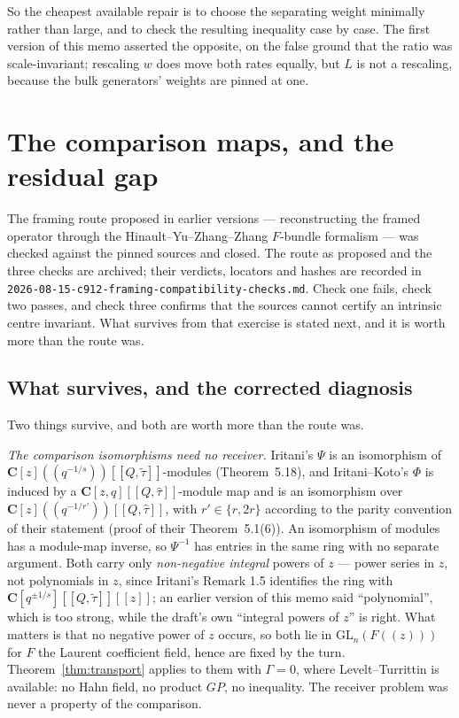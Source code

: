 \documentclass[11pt]{article}
\theoremstyle{definition}
\theoremstyle{remark}
\newcommand{\C}{\mathbf C}
\begin{document}
So the cheapest available repair is to choose the separating weight minimally
rather than large, and to check the resulting inequality case by case. The first
version of this memo asserted the opposite, on the false ground that the ratio
was scale-invariant; rescaling $w$ does move both rates equally, but $L$ is not
a rescaling, because the bulk generators' weights are pinned at one.

\section{The comparison maps, and the residual gap}
\label{sec:hyzz}

The framing route proposed in earlier versions --- reconstructing the
framed operator through the Hinault--Yu--Zhang--Zhang $F$-bundle
formalism --- was checked against the pinned sources and closed.  The
route as proposed and the three checks are archived; their verdicts,
locators and hashes are recorded in
\texttt{2026-08-15-c912-framing-compatibility-checks.md}.  Check one
fails, check two passes, and check three confirms that the sources
cannot certify an intrinsic centre invariant.  What survives from that
exercise is stated next, and it is worth more than the route was.

\subsection*{What survives, and the corrected diagnosis}

Two things survive, and both are worth more than the route was.

\emph{The comparison isomorphisms need no receiver.} Iritani's $\Psi$ is an
isomorphism of $\C[z](\!(q^{-1/s})\!)[[Q,\widetilde\tau]]$-modules
(Theorem~5.18), and Iritani--Koto's $\Phi$ is induced by a
$\C[z,q][[Q,\widehat\tau]]$-module map and is an isomorphism over
$\C[z](\!(q^{-1/r'})\!)[[Q,\widehat\tau]]$, with $r'\in\{r,2r\}$ according to
the parity convention of their statement (proof of their Theorem~5.1(6)). An
isomorphism of modules has a module-map inverse, so $\Psi^{-1}$ has entries in
the same ring with no separate argument. Both carry only \emph{non-negative
integral} powers of $z$ --- power series in $z$, not polynomials in $z$, since
Iritani's Remark 1.5 identifies the ring with
$\C[q^{\pm1/s}][[Q,\widetilde\tau]][[z]]$; an earlier version of this memo said
``polynomial'', which is too strong, while the draft's own ``integral powers of
$z$'' is right. What matters is that no negative power of $z$ occurs, so both lie
in $\mathrm{GL}_n(F(\!(z)\!))$ for $F$ the Laurent coefficient field, hence are
fixed by the turn. Theorem~\ref{thm:transport} applies to them with $\Gamma=0$,
where Levelt--Turrittin is available: no Hahn field, no product $GP$, no
inequality. The receiver problem was never a property of the comparison.
\end{document}
